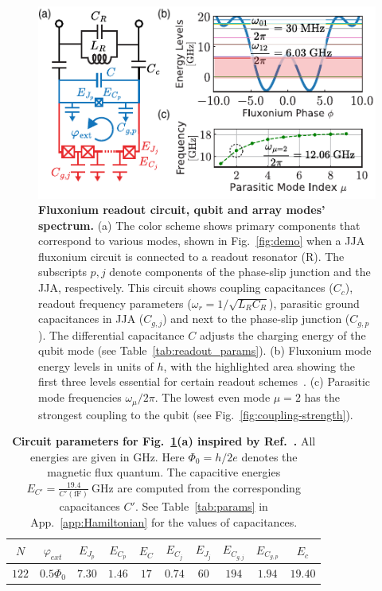 \documentclass[%
reprint,
superscriptaddress,
 amsmath,amssymb,
 aps,
 prx,
longbibliography,
floatfix,
]{revtex4-2}
\begin{document}
\begin{figure}[t]
\centering    
\includegraphics[width=\linewidth]{Figures/Meas_Circuit.pdf}
\caption{{\bf Fluxonium readout circuit, qubit and array modes' spectrum.} (a) The color scheme shows primary components that correspond to various modes, shown in Fig.~\ref{fig:demo} when a JJA fluxonium circuit is connected to a readout resonator (R). The subscripts $p,j$ denote components of the phase-slip junction and the JJA, respectively. This circuit shows coupling capacitances ($C_c$), readout frequency parameters ($\omega_r=1/\sqrt{L_{R}C_{R}}$), parasitic ground capacitances in JJA ($C_{g,j}$) and next to the phase-slip junction ($C_{g,p}$). The differential capacitance $C$ adjusts the charging energy of the qubit mode (see Table~\ref{tab:readout_params}). (b) Fluxonium mode energy levels in units of $h$, with the highlighted area showing the first three levels essential for certain readout schemes~\cite{zhang_universal_2021}. (c) Parasitic mode frequencies $\omega_\mu/2\pi$. The lowest even mode $\mu = 2$ has the strongest coupling to the qubit (see Fig.~\ref{fig:coupling-strength}). 
}
\label{fig:meas_circuit}
\end{figure}

\renewcommand{\arraystretch}{1.5} %
\begin{table}[htb]
\centering
\begin{tabular}{|c|c|c|c|c|c|c|c|c|c|}
    \hline
     $N$ & $\varphi_{ext}$ & $E_{J_p}$ & $E_{C_p}$ & $E_C$ & $E_{C_j}$ & $E_{J_j}$ & $E_{C_{g,j}}$ & $E_{C_{g,p}}$ & $E_c$ \\
    \hline
    $122$ & $0.5\Phi_0$ & $7.30$ & $1.46$ & $17$ & $0.74$ & $60$ & $194$ & $1.94$ & $19.40$ \\
    \hline
\end{tabular}
\caption{{\bf Circuit parameters for Fig.~\ref{fig:meas_circuit}(a) inspired by Ref.~\cite{zhang_universal_2021}.} All energies are given in GHz. Here $\Phi_0=h/2e$ denotes the magnetic flux quantum. The capacitive energies $E_{C'}=\frac{19.4}{{C'}(\mathrm{fF})} \ \mathrm{GHz}$ are computed from the corresponding capacitances $C'$. See Table~\ref{tab:params} in App.~\ref{app:Hamiltonian} for the values of capacitances.}
\label{tab:circuit_params}
\end{table}
\end{document}
